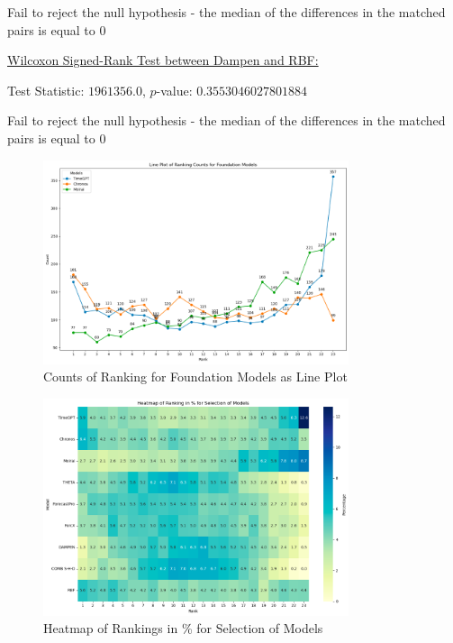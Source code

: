 \documentclass[12pt,a4paper]{article}
\begin{document}
Fail to reject the null hypothesis - the median of the differences in the matched pairs is equal to 0

\underline{Wilcoxon Signed-Rank Test between Dampen and RBF:}

Test Statistic: $1961356.0$, $p$-value: $0.3553046027801884$

Fail to reject the null hypothesis - the median of the differences in the matched pairs is equal to 0

\begin{figure}[htbp]
  \centering
  \includegraphics[width=0.8\textwidth]{counts_of_rank_lineplot.png}
  \caption{Counts of Ranking for Foundation Models as Line Plot} 
  \label{counts_of_rank_lineplot}
\end{figure}

\begin{figure}[htbp]
  \centering
  \includegraphics[width=0.8\textwidth]{heatmap.png}
  \caption{Heatmap of Rankings in \% for Selection of Models} 
  \label{heatmap}
\end{figure}
\end{document}
